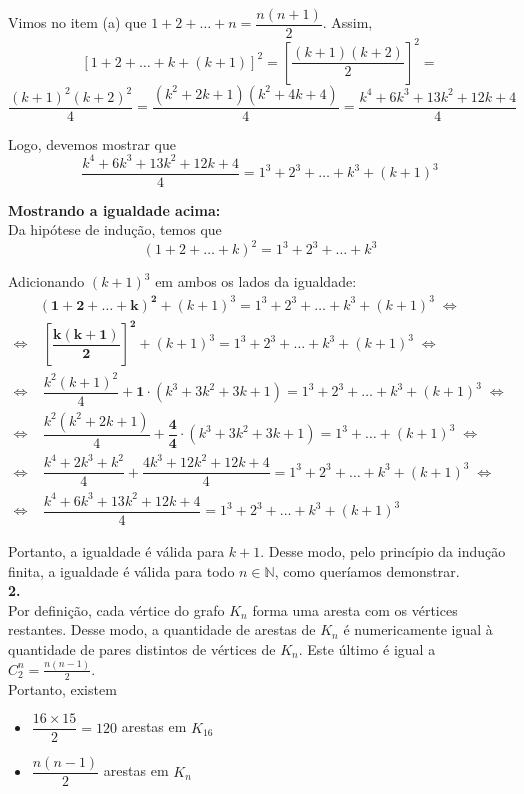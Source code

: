 \documentclass[12pt, a4paper]{article}
\begin{document}
Vimos no item (a) que \(1+2+\ldots+n = \dfrac{n(n+1)}{2}\). Assim, \[[1+2+\ldots+k+(k+1)]^2 = \left[\dfrac{(k+1)(k+2)}{2}\right]^2 =\] \[\dfrac{(k+1)^2(k+2)^2}{4} = \dfrac{(k^2+2k+1)(k^2+4k+4)}{4} = \dfrac{k^4+6k^3+13k^2+12k + 4}{4}\] 

Logo, devemos mostrar que \[\dfrac{k^4+6k^3+13k^2+12k+4}{4} = 1^3 + 2^3 + \ldots+k^3 + (k+1)^3\] 

\textbf{Mostrando a igualdade acima:} \\

Da hipótese de indução, temos que \[(1+2+\ldots + k)^2 = 1^3 + 2^3 + \ldots + k^3\]

Adicionando \((k+1)^3\) em ambos os lados da igualdade: 
\begin{align}
&\mathbf{(1+2+\ldots + k)^2}+(k+1)^3  = 1^3 + 2^3 + \ldots + k^3 +(k+1)^3 \; \Longleftrightarrow \\
\Longleftrightarrow & \; \mathbf{\left[\dfrac{k(k+1)}{2}\right]^2} + (k+1)^3 = 1^3 + 2^3 + \ldots + k^3 +(k+1)^3 \; \Longleftrightarrow  \\
\Longleftrightarrow & \; \dfrac{k^2(k+1)^2}{4} + \mathbf{1}\cdot{(k^3+3k^2+3k+1)} = 1^3 + 2^3 + \ldots + k^3 +(k+1)^3 \; \Longleftrightarrow  \\
\Longleftrightarrow & \; \dfrac{k^2(k^2+2k+1)}{4} + \mathbf{\dfrac{4}{4}}\cdot{(k^3+3k^2+3k+1)} = 1^3 + \ldots +(k+1)^3 \; \Longleftrightarrow \\
\Longleftrightarrow & \; \dfrac{k^4+2k^3+k^2}{4} + \dfrac{4k^3 + 12k^2 + 12k + 4}{4} = 1^3 + 2^3 + \ldots + k^3 +(k+1)^3 \; \Longleftrightarrow  \\
\Longleftrightarrow & \; \dfrac{k^4+6k^3+13k^2+12k+4}{4} = 1^3 + 2^3 + \ldots + k^3 +(k+1)^3
\end{align}

Portanto, a igualdade é válida para \(k+1\). Desse modo, pelo princípio da indução finita, a igualdade é válida para todo \(n \in \mathbb{N}\), como queríamos demonstrar. \\

\textbf{2.} \\

Por definição, cada vértice do grafo \(K_n\) forma uma aresta com os vértices restantes. Desse modo, a quantidade de arestas de \(K_n\) é numericamente igual à quantidade de pares distintos de vértices de \(K_n\). Este último é igual a \(C^n_2 = \frac{n(n-1)}{2}\). \\

Portanto, existem 
\begin{itemize}
\item \(\dfrac{16\times15}{2}=120\) arestas em \(K_{16}\)

\item \(\dfrac{n(n-1)}{2}\) arestas em \(K_n\)
\end{itemize}
\end{document}
